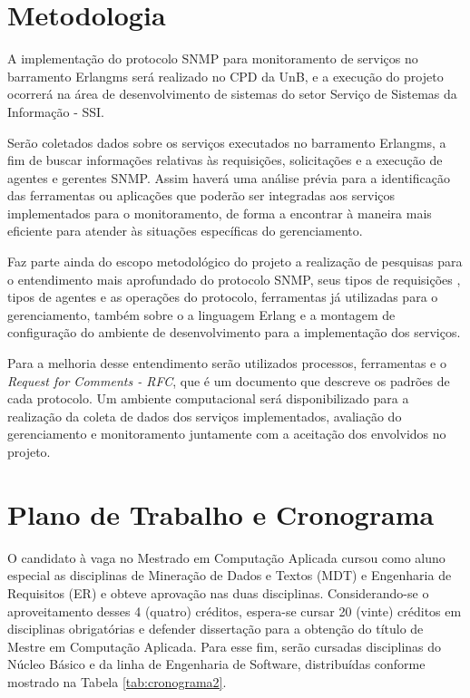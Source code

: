 \documentclass[qualidr]{eesc}
\begin{document}
\section{Metodologia}

A implementação do protocolo SNMP para monitoramento de serviços no barramento Erlangms será realizado no CPD da UnB, e a execução do projeto ocorrerá  na área de desenvolvimento de sistemas do setor Serviço de Sistemas da Informação - SSI. 

Serão coletados dados sobre os serviços executados no barramento Erlangms, a fim de buscar informações relativas às requisições, solicitações e a execução de agentes e gerentes SNMP. Assim haverá uma análise prévia para a identificação das ferramentas ou aplicações que poderão ser integradas aos serviços implementados para o monitoramento, de forma a encontrar à maneira mais eficiente para atender às situações específicas do gerenciamento.

Faz parte ainda do escopo metodológico do projeto a realização de pesquisas para o entendimento mais aprofundado do protocolo SNMP, seus tipos de requisições , tipos de agentes e as operações do protocolo, ferramentas já utilizadas para o gerenciamento, também sobre o a linguagem Erlang e a montagem de configuração do ambiente de desenvolvimento para a implementação dos serviços. 

Para a melhoria desse entendimento serão utilizados  processos, ferramentas e o \textit{Request for Comments - RFC}\cite{Case}, que  é um documento que descreve os padrões de cada protocolo. Um ambiente computacional será disponibilizado para a realização da coleta de dados dos serviços implementados, avaliação do gerenciamento e monitoramento juntamente com a aceitação dos envolvidos no projeto.

\section{Plano de Trabalho e Cronograma}

O candidato à vaga no Mestrado em Computação Aplicada cursou como aluno especial as disciplinas de Mineração de Dados e Textos (MDT) e  Engenharia de Requisitos (ER) e obteve aprovação nas duas disciplinas. Considerando-se o aproveitamento desses 4 (quatro) créditos, espera-se cursar 20 (vinte) créditos em disciplinas obrigatórias e defender dissertação para a obtenção do título de Mestre em Computação Aplicada. Para esse fim, serão cursadas disciplinas do Núcleo Básico e da linha de Engenharia de Software, distribuídas conforme mostrado na Tabela \ref{tab:cronograma2}. 
\end{document}
